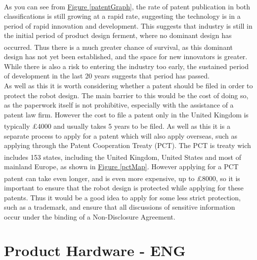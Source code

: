 \documentclass[11pt]{article}		%
\newcommand{\supercite}[1]{\textsuperscript{\cite{#1}}}		%
\newcommand{\figref}[1]{\hyperref[#1]{Figure \ref*{#1}}}    %
\begin{document}
		\\
		As you can see from \figref{patentGraph}, the rate of patent publication in both classifications is still growing at a rapid rate, suggesting the technology is in a period of rapid innovation and development.
		This suggests that industry is still in the initial period of product design ferment, where no dominant design has occurred\supercite{christensen1998innovation}.
		Thus there is a much greater chance of survival, as this dominant design has not yet been established, and the space for new innovators is greater.
		While there is also a risk to entering the industry too early, the sustained period of development in the last 20 years suggests that period has passed.
		\\
		As well as this it is worth considering whether a patent should be filed in order to protect the robot design.
		The main barrier to this would be the cost of doing so, as the paperwork itself is not prohibitive, especially with the assistance of a patent law firm.
		However the cost to file a patent only in the United Kingdom is typically £4000 and usually takes 5 years to be filed\supercite{uk2020patenting}.
		As well as this it is a separate process to apply for a patent which will also apply overseas, such as applying through the Patent Cooperation Treaty (PCT).
		The PCT is treaty wich includes 153 states\supercite{pct2020states}, including the United Kingdom, United States and most of mainland Europe, as shown in \figref{pctMap}.
		However applying for a PCT patent can take even longer, and is even more expensive, up to £8000\supercite{mewburn2020international}, so it is important to ensure that the robot design is protected while applying for these patents.
		Thus it would be a good idea to apply for some less strict protection, such as a trademark, and ensure that all discussions of sensitive information occur under the binding of a Non-Disclosure Agreement.
	
	\section{Product Hardware - ENG}
	
\end{document}
